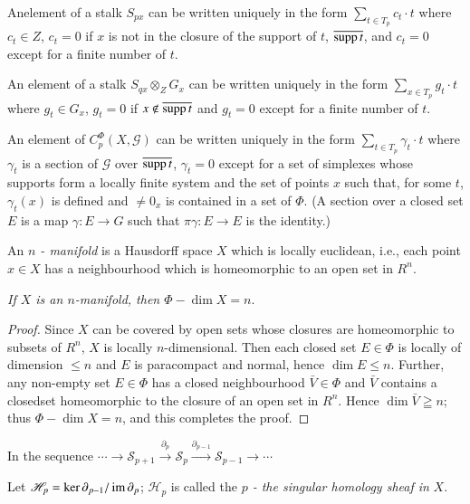 An\pageoriginale element of a stalk $S_{px}$ can be written uniquely
in the form $\sum\limits_{t \in T_p}  c_t \cdot t$  where $c_t \in Z$,
$c_t = 0$ if $x$ 
is not in the closure of the support of $t$, $\overline{\operatorname{supp} t}$, and
$c_t = 0$ except for a finite number of $t$. 

An element of a stalk $S_{qx} \otimes_Z G_x$ can be written uniquely
in the form $\sum\limits_{x \in T_p}  g_t \cdot t$ where $g_t \in G_x$, $g_t
= 0$ if $x \not\in \overline{\operatorname{supp} t}$ and $g_t = 0$ except for a
finite number of $t$. 

An element of $C^{\Phi}_p (X,\mathscr{G})$ can be written uniquely in
the form $\sum\limits_{t \in T_p} \gamma_t \cdot t$ where $\gamma_t$ is a
section of $\mathscr{G}$ over $\overline{\operatorname{supp} t}$, $\gamma_t = 0$
except for a set of simplexes whose supports form a locally finite
system and the set of points $x$ such that, for some $t$, $\gamma_t(x)$
is defined and $\neq 0_x$ is contained in a set of $\Phi$. (A section
over a closed set $E$ is a map $\gamma : E \rightarrow G$ such that
$\pi \gamma : E \rightarrow E$ is the identity.) 

\begin{defi*}
An \textit{$n$ - manifold} is a Hausdorff space $X$ which is locally
euclidean, i.e., each point $x \in X$ has a neighbourhood which is
homeomorphic to an open set in $R^n$. 
\end{defi*}

\textit{If $X$ is an $n$-manifold, then $\Phi - \dim X = n$}. 

\begin{proof}
Since $X$ can be covered by open sets whose closures are homeomorphic
to subsets of $R^n$, $X$ is locally $n$-dimensional. Then each closed
set $E \in \Phi$ is locally of dimension $\leq n$ and $E$ is
paracompact and normal, hence $\dim E \leq n$. Further, any non-empty
set $E \in \Phi$ has a closed neighbourhood $\bar{V} \in \Phi$ and
$\bar{V}$ contains a closed\pageoriginale set homeomorphic to the
closure of an open set in $R^n$. Hence $\dim \bar{V} \geqq n$; thus
$\Phi - \dim X = n$, and this completes the proof.  
\end{proof}

In the sequence $\cdots \rightarrow \mathscr{S}_{p+1}
\xrightarrow{\partial_p} \mathscr{S}_p \xrightarrow{\partial_{p-1}}
\mathscr{S}_{p-1} \rightarrow \cdots$ 

 Let $\mathscr{H}_p = \ker \partial_{p-1}/\operatorname{im} \partial_p$;
 $\mathscr{H}_p$ is called the \textit{$p$ - the singular homology
   sheaf in} $X$. 


